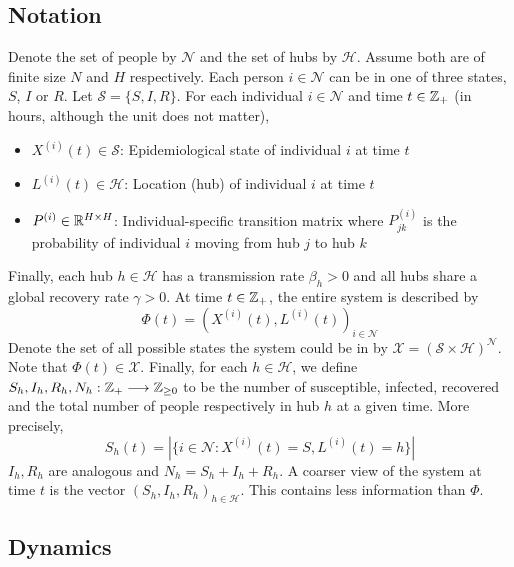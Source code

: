 \documentclass[a4paper]{article}
\begin{document}
	\subsection{Notation}
	Denote the set of people by $\mathcal{N}$ and the set of hubs by $\mathcal{H}$. Assume both are of finite size $N$ and $H$ respectively. Each person $i \in \mathcal{N}$ can be in one of three states, $S$, $I$ or $R$. Let $\mathcal{S} = \{S, I, R\}$. For each individual $i \in \mathcal{N}$ and time $t \in \mathbb{Z}_{+}$ (in hours, although the unit does not matter),
	\begin{itemize}
		\item $X^{(i)}(t) \in \mathcal{S}$: Epidemiological state of individual $i$ at time $t$
		\item $L^{(i)}(t) \in \mathcal{H}$: Location (hub) of individual $i$ at time $t$
		\item $P^{(i)} \in \mathbb{R}^{H \times H}$: Individual-specific transition matrix where $P_{jk}^{(i)}$ is the probability of individual $i$ moving from hub $j$ to hub $k$
	\end{itemize}
	Finally, each hub $h \in \mathcal{H}$ has a transmission rate $\beta_{h} > 0$ and all hubs share a global recovery rate $\gamma > 0$. At time $t \in \mathbb{Z}_{+}$, the entire system is described by
	$$\Phi(t) = (X^{(i)}(t), L^{(i)}(t))_{i \in \mathcal{N}}$$
	Denote the set of all possible states the system could be in by $\mathcal{X} = (\mathcal{S} \times \mathcal{H})^{\mathcal{N}}$. Note that $\Phi(t) \in \mathcal{X}$. Finally, for each $h \in \mathcal{H}$, we define $S_{h}, I_{h}, R_{h}, N_{h}: \mathbb{Z}_{+} \longrightarrow \mathbb{Z}_{\geq 0}$ to be the number of susceptible, infected, recovered and the total number of people respectively in hub $h$ at a given time. More precisely,
	$$S_{h}(t) = |\{i \in \mathcal{N}: X^{(i)}(t) = S, L^{(i)}(t) = h\}|$$
	$I_{h}, R_{h}$ are analogous and $N_{h} = S_{h} + I_{h} + R_{h}$. A coarser view of the system at time $t$ is the vector $(S_{h}, I_{h}, R_{h})_{h \in \mathcal{H}}$. This contains less information than $\Phi$.
	\subsection{Dynamics}
\end{document}
